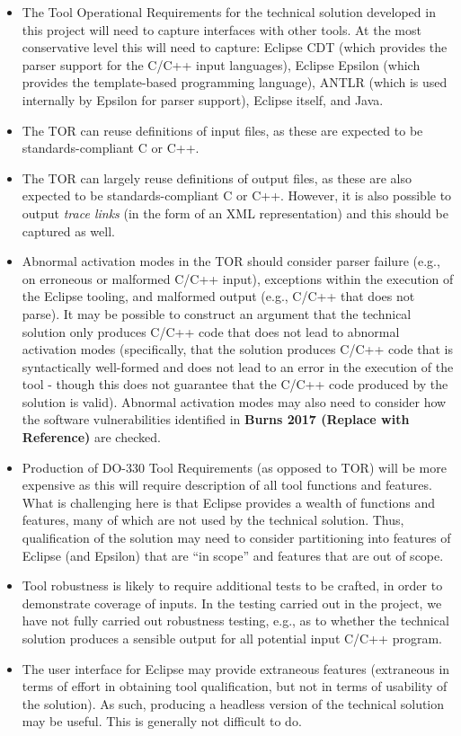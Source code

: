 \documentclass{llncs}
\begin{document}
\begin{itemize}
\item The Tool Operational Requirements for the technical solution developed in this project will need to capture interfaces with other tools. At the most conservative level this will need to capture: Eclipse CDT (which provides the parser support for the C/C++ input languages), Eclipse Epsilon (which provides the template-based programming language), ANTLR (which is used internally by Epsilon for parser support), Eclipse itself, and Java.

\item The TOR can reuse definitions of input files, as these are expected to be standards-compliant C or C++.

\item The TOR can largely reuse definitions of output files, as these are also expected to be standards-compliant C or C++. However, it is also possible to output \textit{trace links} (in the form of an XML representation) and this should be captured as well.

\item Abnormal activation modes in the TOR should consider parser failure (e.g., on erroneous or malformed C/C++ input), exceptions within the execution of the Eclipse tooling, and malformed output (e.g., C/C++ that does not parse). It may be possible to construct an argument that the technical solution only produces C/C++ code that does not lead to abnormal activation modes (specifically, that the solution produces C/C++ code that is syntactically well-formed and does not lead to an error in the execution of the tool - though this does not guarantee that the C/C++ code produced by the solution is valid). Abnormal activation modes may also need to consider how the software vulnerabilities identified in \textbf{Burns 2017 (Replace with Reference)} are checked.

\item Production of DO-330 Tool Requirements (as opposed to TOR) will be more expensive as this will require description of all tool functions and features. What is challenging here is that Eclipse provides a wealth of functions and features, many of which are not used by the technical solution. Thus, qualification of the solution may need to consider partitioning into features of Eclipse (and Epsilon) that are ``in scope'' and features that are out of scope.

\item Tool robustness is likely to require additional tests to be crafted, in order to demonstrate coverage of inputs. In the testing carried out in the project, we have not fully carried out robustness testing, e.g., as to whether the technical solution produces a sensible output for all potential input C/C++ program.

\item The user interface for Eclipse may provide extraneous features (extraneous in terms of effort in obtaining tool qualification, but not in terms of usability of the solution). As such, producing a headless version of the technical solution may be useful. This is generally not difficult to do.
\end{itemize}
\end{document}
